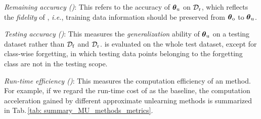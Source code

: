 


\iffalse 
It is also worth noting that one can similarly define {\MIAR}, given by   the MIA rate on the remaining dataset $\Dr$.  However, different from {\MIAF}, {\MIAR}  characterizes the   \textit{privacy}   of $\thetaunl$ about $\Dr$. A \textit{lower} {\MIAR} rate implies less information leakage from   $\thetaunl$ on $\Dr$.
\fi 




\noindent {} \textit{Remaining accuracy (\textbf{\RA})}:   This refers to 
the accuracy of {$\thetaunl$} on $\Dr$, which reflects the \textit{fidelity} of    {\MU} 
 \cite{becker2022evaluating}, {\textit{i.e.}, training data information}  should be  preserved from {$\boldsymbol \theta_\mathrm{o}$} to {$\thetaunl$}. 


\noindent {} \textit{Testing accuracy (\textbf{\TA})}:  This measures the \textit{generalization} ability of {$\thetaunl$} on  a testing dataset rather than $\mathcal D_\mathrm{f}$ and $\Dr$. {{\TA} is evaluated on the whole test dataset, except for class-wise forgetting, in which testing data points belonging to the forgetting class are not in the testing scope. 
}




\noindent {} \textit{Run-time efficiency (\textbf{\RTE})}:  This measures the computation efficiency of an {\MU} method.  For example,
if we regard the run-time cost of  {\retrain} as the baseline, the computation acceleration gained by different approximate unlearning methods is summarized in Tab.\,\ref{tab: summary_MU_methods_metrics}.





